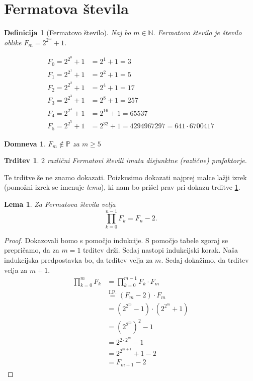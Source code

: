 \documentclass{amsart}
\newcommand{\NN}{\mathbb{N}}
\newcommand{\PP}{\mathbb{P}}
\newtheorem{lema}[izrek]{Lema}
\newtheorem{trditev}[izrek]{Trditev}
\newtheorem{definicija}[izrek]{Definicija}
\newtheorem{domneva}[izrek]{Domneva}
\begin{document}
\section{Fermatova števila}

\begin{definicija}[Fermatovo število]
    Naj bo \(m \in \NN.\) \emph{Fermatovo število} je število oblike \(F_m = 2^{2^m}+1\). 
\end{definicija}

\begin{align*}
    F_0 = 2^{2^0}+1 &= 2^1+1 = 3\\
    F_1 = 2^{2^1}+1 &= 2^2+1 = 5\\
    F_2 = 2^{2^2}+1 &= 2^4+1 = 17\\
    F_3 = 2^{2^3}+1 &= 2^8+1 = 257\\
    F_4 = 2^{2^4}+1 &= 2^{16}+1 = 65537\\
    F_5 = 2^{2^5}+1 &= 2^{32}+1 = 4294967297 = 641 \cdot 6700417
\end{align*}

\begin{domneva}
    \(F_m \notin \PP\) za \(m \geq 5\)
\end{domneva}

\begin{trditev}
    \label{trditev:fermat}
    \(2\) različni Fermatovi števili imata disjunktne (različne) prafaktorje.
\end{trditev}

Te trditve še ne znamo dokazati. Poizkusimo dokazati najprej malce lažji izrek (pomožni izrek se imenuje \emph{lema}), ki nam 
bo prišel prav pri dokazu trditve \ref{trditev:fermat}.

\begin{lema}
    \label{lema:fermat}
    Za Fermatova števila velja 
    \[\prod_{k=0}^{n-1} F_k = F_n - 2.\]
\end{lema}

\begin{proof}
    Dokazovali bomo s pomočjo indukcije. S pomočjo tabele zgoraj se prepričamo, da za \(m = 1\) trditev drži.
    Sedaj nastopi indukcijski korak. Naša indukcijska predpostavka bo, da trditev velja za \(m\). 
    Sedaj dokažimo, da trditev velja za \(m+1\).
    \begin{align*}
        \prod_{k=0}^{m} F_k &= \prod_{k=0}^{m-1} F_k \cdot F_m\\
        &\stackrel{\text{I.P.}}{=} \left(F_m -2\right) \cdot F_m\\
        &= \left(2^{2^m}-1\right)\cdot\left(2^{2^m}+1\right)\\
        &=\left(2^{2^m}\right)^2 - 1\\
        &=2^{2\cdot 2^m} -1\\
        &=2^{2^{m+1}}+1-2\\
        &=F_{m+1}-2
    \end{align*}
\end{proof}
\end{document}
